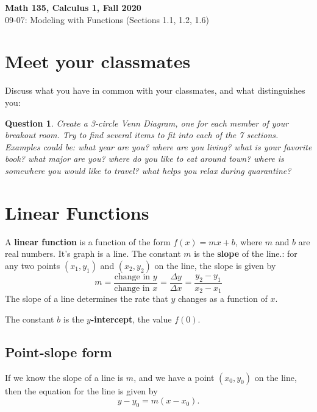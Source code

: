 \documentclass[11pt,reqno,final]{amsart}
\numberwithin{equation}{section}
\numberwithin{figure}{section}
\newtheorem{question}{Question}
\theoremstyle{definition} %
\begin{document}
\begin{center}
        \textbf{\Large Math 135, Calculus 1, Fall 2020}\\[10pt]
        {\large 09-07: Modeling with Functions (Sections 1.1, 1.2, 1.6)}
\end{center}

\thispagestyle{empty}

\renewcommand{\thesection}{\Alph{section}}

\section{Meet your classmates}

Discuss what you have in common with your classmates, and what distinguishes you:
\begin{question}
        Create a 3-circle Venn Diagram, one for each member of your breakout room.
        Try to find several items to fit into each of the 7 sections.
        Examples could be: what year are you? where are you living? what is your favorite book? what major are you? where do you like to eat around town? where is somewhere you would like to travel? what helps you relax during quarantine?
\end{question}

\section{Linear Functions}

\begin{framed}
        A \textbf{linear function} is a function of the form $f(x) = mx + b$, where $m$ and $b$ are real numbers.
        It's graph is a line.
        The constant $m$ is the \textbf{slope} of the line.:
        for any two points $(x_1, y_1)$ and $(x_2, y_2)$ on the line, the slope is given by
        \[
                m = \dfrac{\mbox{change in $y$}}{\mbox{change in $x$}} = \dfrac{\Delta y}{\Delta x} = \dfrac{y_2 - y_1}{x_2 - x_1}
        \]
        The slope of a line determines the rate that $y$ changes as a function of $x$.
        
        The constant $b$ is the \textbf{$y$-intercept}, the value $f(0)$.
\end{framed}

\subsection*{Point-slope form}
If we know the slope of a line is $m$, and we have a point $(x_0,y_0)$ on the line,
then the equation for the line is given by
\[
        y - y_0 = m(x-x_0).
\]
\end{document}
